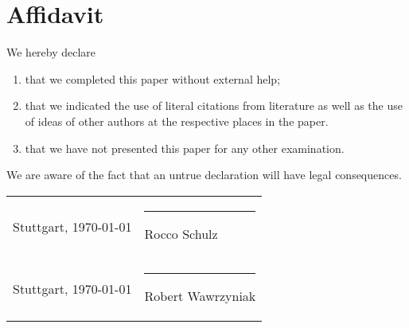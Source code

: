 \newpage
\pagestyle{empty}

\section*{Affidavit}

\vspace{0.5cm}

We hereby declare\\

\begin{enumerate}
	\item that we completed this paper without external help;
	\item that we indicated the use of literal citations from literature as 
	      well as the use of ideas of other authors at the respective places in the paper.
	\item that we have not presented this paper for any other examination.
\end{enumerate}

We are aware of the fact that an untrue declaration will have legal consequences.
\\
\vspace{2.6cm}

\renewcommand{\arraystretch}{2} %

\begin{tabular*}{\textwidth} {p{} p{}}

Stuttgart, \today & \rule{0.4\textwidth}{1pt}\newline Rocco Schulz\\

Stuttgart, \today & \rule{0.4\textwidth}{1pt}\newline Robert Wawrzyniak\\

\end{tabular*}

